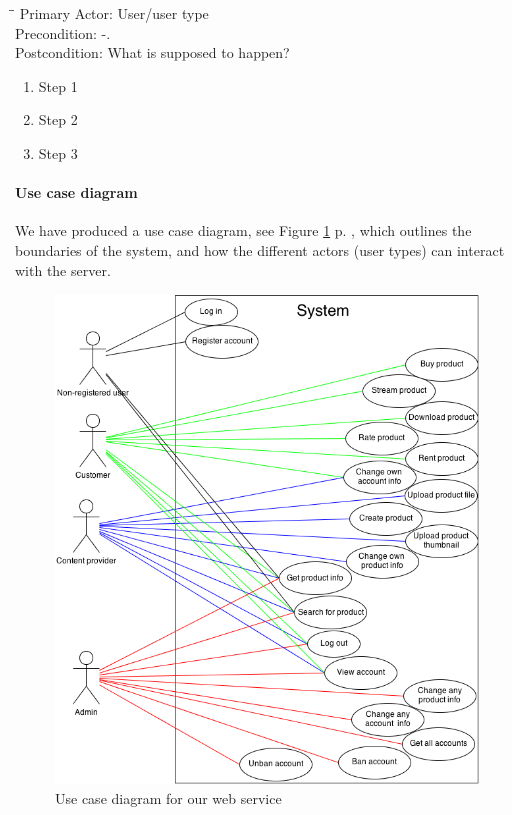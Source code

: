 \begin{tabbing}
\hspace{5mm}\=\hspace{26mm}\=\kill
\>Primary Actor:\> User/user type\\
\>Precondition:\> -.\\
\>Postcondition:\> What is supposed to happen?
\end{tabbing}
\begin{enumerate}
	\item Step 1
	\item Step 2
	\item Step 3
\end{enumerate}
\vspace{3mm}

\paragraph{Use case diagram}
We have produced a use case diagram, see Figure \ref{useCaseImg} p. \pageref{useCaseImg}, which outlines the boundaries of the system, and how the different actors (user types) can interact with the server. 
\begin{figure}[h]
\centering
\includegraphics[scale=0.5]{illustrations/UseCaseDiagram.png}
\caption{Use case diagram for our web service}
\label{useCaseImg}
\end{figure}